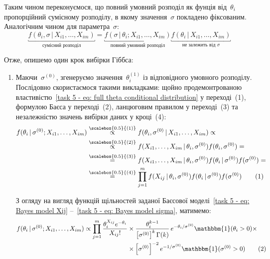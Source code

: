 Таким чином переконуємося, що повний умовний розподіл як фунція від~$\theta_i$ пропорційний сумісному розподілу, в якому значення~$\sigma$ покладено фіксованим. Аналогічним чином для параметра~$\sigma$:
\begin{equation}\label{task 5 - eq: full sigmaconditional distribution}
    \underbracket{f(\theta_i, \sigma \,|\, X_{i1},\ldots,X_{im})}_{\text{сумісний розподіл}} = \underbracket{f(\sigma \,|\, \theta_i; X_{i1},\ldots,X_{im})}_{\text{повний умовний розподіл}} \underbracket{f(\theta_i \,|\, X_{i1},\ldots,X_{im})}_{\text{не залежить від $\sigma$}}
\end{equation}

Отже, опишемо один крок вибірки Гіббса:
\begin{enumerate}
    \item Маючи~$\sigma^{(0)}$, згенеруємо значення~$\theta_i^{(1)}$ із відповідного умовного розподілу. Послідовно скористаємося такими викладками: щойно продемонтрованою властивістю~\eqref{task 5 - eq: full theta conditional distribution} у переході~(1), формулою Баєса у переході~(2), ланцюговим правилом у переході~(3) та незалежністю значень вибірки даних у кроці~(4):
        \begin{align*}\label{task 5 - eq: chain of rules under full conditional distribution}
            f(\theta_i \,|\, \sigma^{(0)}; X_{i1},\ldots,X_{im})
            & \overset{\scalebox{0.5}{(1)}}{\propto} f(\theta_i, \sigma^{(0)} \,|\, X_{i1},\ldots,X_{im}) \propto \\
            & \overset{\scalebox{0.5}{(2)}}{\propto} f(X_{i1},\ldots,X_{im} \,|\, \theta_i, \sigma^{(0)}) f(\theta_i, \sigma^{(0)}) = \\
            & \overset{\scalebox{0.5}{(3)}}{=} f(X_{i1},\ldots,X_{im} \,|\, \theta_i, \sigma^{(0)}) f(\theta_i \,|\, \sigma^{(0)}) f(\sigma^{(0)}) = \\
            & \overset{\scalebox{0.5}{(4)}}{=} \prod_{j=1}^{m} f(X_{ij} \,|\, \theta_i, \sigma^{(0)}) f(\theta_i \,|\, \sigma^{(0)}) f(\sigma^{(0)}) \stepcounter{equation}\tag{\theequation}
        \end{align*}

        З огляду на вигляд функцій щільностей заданої Баєсової моделі~\eqref{task 5 - eq: Bayes model Xij} --~\eqref{task 5 - eq: Bayes model sigma}, матимемо:
        \begin{align*}
            f(\theta_i \,|\, \sigma^{(0)}; X_{i1},\ldots,X_{im}) \propto \prod_{j=1}^{m} \frac{\theta_i^{X_{ij}} e^{-\theta_i}}{X_{ij}!} 
            & \times \frac{\theta_i^{k-1}}{\left[\sigma^{(0)}\right]^{k}\Gamma(k)}\, e^{-\theta_i/\sigma^{(0)}} \mathbbm{1}(\theta_i>0) \times \\
            & \times \left[\sigma^{(0)}\right]^{-2}e^{-1/\sigma^{(0)}} \mathbbm{1}(\sigma^{(0)}>0) \stepcounter{equation}\tag{\theequation}
        \end{align*}


\end{enumerate}
